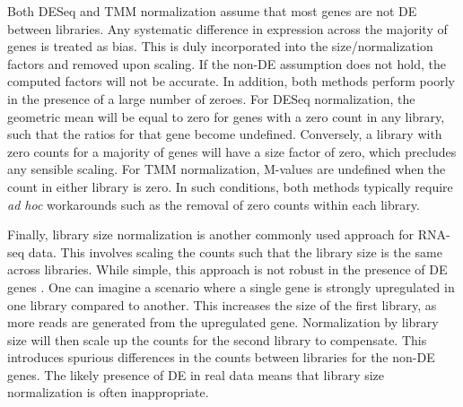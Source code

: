 \documentclass{article}
\begin{document}
Both DESeq and TMM normalization assume that most genes are not DE between libraries.
Any systematic difference in expression across the majority of genes is treated as bias.
This is duly incorporated into the size/normalization factors and removed upon scaling.
If the non-DE assumption does not hold, the computed factors will not be accurate.
In addition, both methods perform poorly in the presence of a large number of zeroes.
For DESeq normalization, the geometric mean will be equal to zero for genes with a zero count in any library, such that the ratios for that gene become undefined.
Conversely, a library with zero counts for a majority of genes will have a size factor of zero, which precludes any sensible scaling.
For TMM normalization, M-values are undefined when the count in either library is zero.
In such conditions, both methods typically require \textit{ad hoc} workarounds such as the removal of zero counts within each library.

Finally, library size normalization is another commonly used approach for RNA-seq data.
This involves scaling the counts such that the library size is the same across libraries.
While simple, this approach is not robust in the presence of DE genes \cite{robinson2010scaling}.
One can imagine a scenario where a single gene is strongly upregulated in one library compared to another.
This increases the size of the first library, as more reads are generated from the upregulated gene.
Normalization by library size will then scale up the counts for the second library to compensate.
This introduces spurious differences in the counts between libraries for the non-DE genes.
The likely presence of DE in real data means that library size normalization is often inappropriate.
\end{document}
